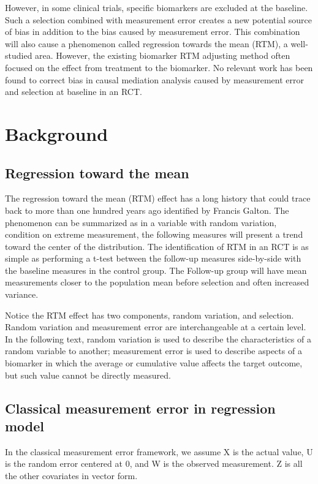\documentclass{article}
\begin{document}
However, in some clinical trials, specific biomarkers are excluded at the baseline. Such a selection combined with measurement error creates a new potential source of bias in addition to the bias caused by measurement error. This combination will also cause a phenomenon called regression towards the mean (RTM), a well-studied area. However, the existing biomarker RTM adjusting method often focused on the effect from treatment to the biomarker. No relevant work has been found to correct bias in causal mediation analysis caused by measurement error and selection at baseline in an RCT. 



\section{Background}

\subsection{Regression toward the mean}

The regression toward the mean (RTM) effect has a long history that could trace back to more than one hundred years ago identified by Francis Galton. The phenomenon can be summarized as in a variable with random variation, condition on extreme measurement, the following measures will present a trend toward the center of the distribution. The identification of RTM in an RCT is as simple as performing a t-test between the follow-up measures side-by-side with the baseline measures in the control group. The Follow-up group will have mean measurements closer to the population mean before selection and often increased variance. 

Notice the RTM effect has two components, random variation, and selection. Random variation and measurement error are interchangeable at a certain level. In the following text, random variation is used to describe the characteristics of a random variable to another; measurement error is used to describe aspects of a biomarker in which the average or cumulative value affects the target outcome, but such value cannot be directly measured.

\subsection{Classical measurement error in regression model}

In the classical measurement error framework, we assume X is the actual value, U is the random error centered at 0, and W is the observed measurement. Z is all the other covariates in vector form. 
\end{document}
